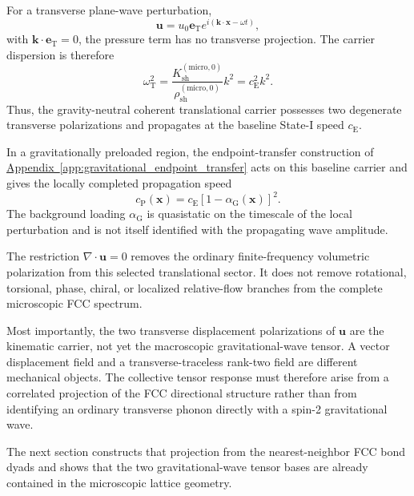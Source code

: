 For a transverse plane-wave perturbation,
\begin{equation}
    \mathbf{u} = u_{0}\mathbf{e}_{\mathrm{T}} e^{i(\mathbf{k} \cdot \mathbf{x} - \omega t)},
\end{equation}
with $\mathbf{k} \cdot \mathbf{e}_{\mathrm{T}} = 0$, the pressure term has no transverse projection. The carrier dispersion is therefore
\begin{equation}
    \omega_{\mathrm{T}}^{2} = \frac{K_{\mathrm{sh}}^{(\mathrm{micro},0)}}{\rho_{\mathrm{sh}}^{(\mathrm{micro},0)}} k^{2} = c_{\mathrm{E}}^{2}k^{2}.
\end{equation}
Thus, the gravity-neutral coherent translational carrier possesses two degenerate transverse polarizations and propagates at the baseline State-I speed $c_{\mathrm{E}}$.

In a gravitationally preloaded region, the endpoint-transfer construction of \hyperref[app:gravitational_endpoint_transfer]{Appendix~\ref*{app:gravitational_endpoint_transfer}} acts on this baseline carrier and gives the locally completed propagation speed
\begin{equation}
    c_{\mathrm{P}}(\mathbf{x}) = c_{\mathrm{E}} \left[ 1 - \alpha_{\mathrm{G}}(\mathbf{x}) \right]^{2}.
\end{equation}
The background loading $\alpha_{\mathrm{G}}$ is quasistatic on the timescale of the local perturbation and is not itself identified with the propagating wave amplitude.

The restriction $\nabla \cdot \mathbf{u} = 0$ removes the ordinary finite-frequency volumetric polarization from this selected translational sector. It does not remove rotational, torsional, phase, chiral, or localized relative-flow branches from the complete microscopic FCC spectrum.

Most importantly, the two transverse displacement polarizations of $\mathbf{u}$ are the kinematic carrier, not yet the macroscopic gravitational-wave tensor. A vector displacement field and a transverse-traceless rank-two field are different mechanical objects. The collective tensor response must therefore arise from a correlated projection of the FCC directional structure rather than from identifying an ordinary transverse phonon directly with a spin-2 gravitational wave.

The next section constructs that projection from the nearest-neighbor FCC bond dyads and shows that the two gravitational-wave tensor bases are already contained in the microscopic lattice geometry.

